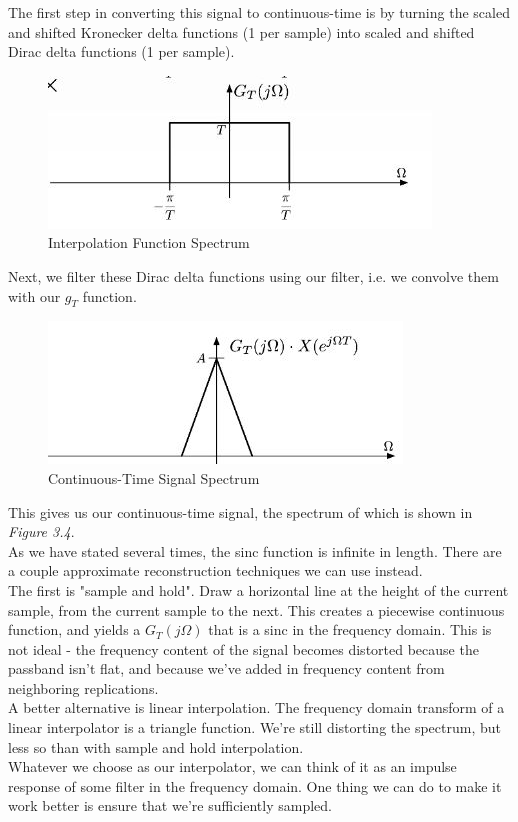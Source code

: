 \documentclass[12pt]{article}
\newcounter{lecture}[section] %
\begin{document}
\noindent The first step in converting this signal to continuous-time is by turning the scaled and shifted Kronecker delta functions (1 per sample) into scaled and shifted Dirac delta functions (1 per sample).
\begin{figure}[H]
    \centering
    \includegraphics[width=0.75\linewidth]{ece6250-lecture03-img3.JPG}
    \caption{Interpolation Function Spectrum}
    \label{fig:placeholder}
\end{figure}
\noindent Next, we filter these Dirac delta functions using our filter, i.e. we convolve them with our $g_T$ function. 
\begin{figure}[H]
    \centering
    \includegraphics[width=0.75\linewidth]{ece6250-lecture03-img4.JPG}
    \caption{Continuous-Time Signal Spectrum}
    \label{fig:placeholder}
\end{figure}
\noindent This gives us our continuous-time signal, the spectrum of which is shown in \textit{Figure 3.4}. \\
As we have stated several times, the sinc function is infinite in length. There are a couple approximate reconstruction techniques we can use instead. \\
The first is "sample and hold". Draw a horizontal line at the height of the current sample, from the current sample to the next. This creates a piecewise continuous function, and yields a $G_T(j \Omega) $ that is a sinc in the frequency domain. This is not ideal - the frequency content of the signal becomes distorted because the passband isn't flat, and because we've added in frequency content from neighboring replications. \\
A better alternative is linear interpolation. The frequency domain transform of a linear interpolator is a triangle function. We're still distorting the spectrum, but less so than with sample and hold interpolation. \\
Whatever we choose as our interpolator, we can think of it as an impulse response of some filter in the frequency domain. One thing we can do to make it work better is ensure that we're sufficiently sampled. \\
\end{document}
